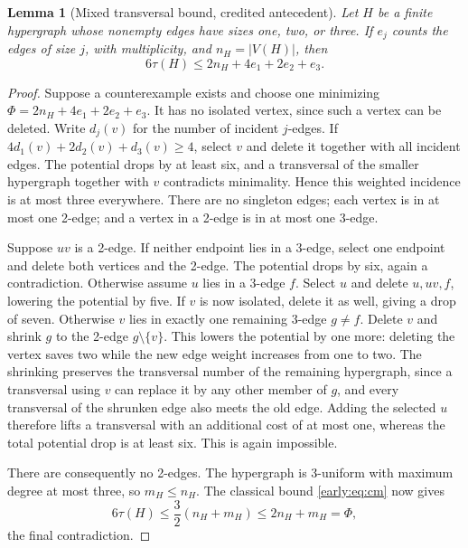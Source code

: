 \documentclass[11pt,a4paper]{article}
\newtheorem{lemma}[theorem]{Lemma}
\theoremstyle{definition}\newtheorem{definition}[theorem]{Definition}
\theoremstyle{remark}\newtheorem{remark}[theorem]{Remark}
\begin{document}
\begin{lemma}[Mixed transversal bound, credited antecedent]
\label{early:lem:mixed-transversal}
Let $H$ be a finite hypergraph whose nonempty edges have sizes one,
two, or three.  If $e_j$ counts the edges of size $j$, with
multiplicity, and $n_H=|V(H)|$, then
\[
 6\tau(H)\leq2n_H+4e_1+2e_2+e_3.
\]
\end{lemma}
\begin{proof}
Suppose a counterexample exists and choose one minimizing
$\Phi=2n_H+4e_1+2e_2+e_3$.  It has no isolated vertex, since such
a vertex can be deleted.  Write $d_j(v)$ for the number of incident
$j$-edges.  If $4d_1(v)+2d_2(v)+d_3(v)\geq4$, select $v$ and
delete it together with all incident edges.  The potential drops by
at least six, and a transversal of the smaller hypergraph together
with $v$ contradicts minimality.  Hence this weighted incidence is
at most three everywhere.  There are no singleton edges; each
vertex is in at most one 2-edge; and a vertex in a 2-edge is in at
most one 3-edge.

Suppose $uv$ is a 2-edge.  If neither endpoint lies in a 3-edge,
select one endpoint and delete both vertices and the 2-edge.  The
potential drops by six, again a contradiction.  Otherwise assume
$u$ lies in a 3-edge $f$.  Select $u$ and delete $u,uv,f$, lowering
the potential by five.  If $v$ is now isolated, delete it as well,
giving a drop of seven.  Otherwise $v$ lies in exactly one remaining
3-edge $g\ne f$.  Delete $v$ and shrink $g$ to the 2-edge
$g\setminus\{v\}$.  This lowers the potential by one more: deleting
the vertex saves two while the new edge weight increases from one
to two.  The shrinking preserves the transversal number of the
remaining hypergraph, since a transversal using $v$ can replace it
by any other member of $g$, and every transversal of the shrunken
edge also meets the old edge.  Adding the selected $u$ therefore
lifts a transversal with an additional cost of at most one, whereas
the total potential drop is at least six.  This is again impossible.

There are consequently no 2-edges.  The hypergraph is 3-uniform
with maximum degree at most three, so $m_H\leq n_H$.  The classical
bound \eqref{early:eq:cm} now gives
\[
 6\tau(H)\leq\frac32(n_H+m_H)\leq2n_H+m_H=\Phi,
\]
the final contradiction.
\end{proof}
\end{document}

